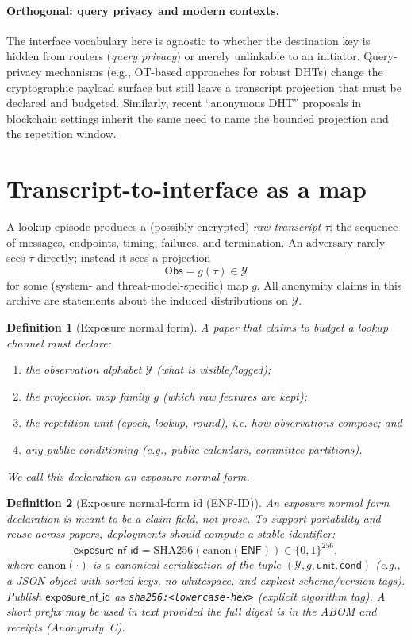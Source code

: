 \documentclass[11pt]{article}
\newtheorem{definition}{Definition}
\begin{document}
\paragraph{Orthogonal: query privacy and modern contexts.}
The interface vocabulary here is agnostic to whether the destination key is hidden from routers (\emph{query privacy})
or merely unlinkable to an initiator.
Query-privacy mechanisms (e.g., OT-based approaches for robust DHTs) change the cryptographic payload surface but still leave a transcript projection that must be declared and budgeted. \cite{BackesQueryPrivacy2012}
Similarly, recent ``anonymous DHT'' proposals in blockchain settings inherit the same need to name the bounded projection and the repetition window. \cite{TsengNCDHT2024}


\section{Transcript-to-interface as a map}
A lookup episode produces a (possibly encrypted) \emph{raw transcript} $\tau$: the sequence of messages, endpoints, timing, failures, and termination.
An adversary rarely sees $\tau$ directly; instead it sees a projection
\[
\mathsf{Obs} = g(\tau) \in \mathcal{Y}
\]
for some (system- and threat-model-specific) map $g$.
All anonymity claims in this archive are statements about the induced distributions on $\mathcal{Y}$.

\begin{definition}[Exposure normal form]
A paper that claims to budget a lookup channel must declare:
\begin{enumerate}[leftmargin=*]
\item the observation alphabet $\mathcal{Y}$ (what is visible/logged);
\item the projection map family $g$ (which raw features are kept);
\item the repetition unit (epoch, lookup, round), i.e. how observations compose; and
\item any public conditioning (e.g., public calendars, committee partitions).
\end{enumerate}
We call this declaration an \emph{exposure normal form}.
\end{definition}

\begin{definition}[Exposure normal-form id (ENF-ID)]
An exposure normal form declaration is meant to be a \emph{claim field}, not prose.
To support portability and reuse across papers, deployments should compute a stable identifier:
\[
\mathsf{exposure\_nf\_id}=\mathrm{SHA256}(\mathrm{canon}(\mathsf{ENF}))\in\{0,1\}^{256},
\]
where $\mathrm{canon}(\cdot)$ is a canonical serialization of the tuple
$(\mathcal Y,g,\mathsf{unit},\mathsf{cond})$ (e.g., a JSON object with sorted keys, no whitespace, and explicit schema/version tags).
Publish $\mathsf{exposure\_nf\_id}$ as \texttt{sha256:<lowercase-hex>} (explicit algorithm tag). A short prefix may be used in text provided the full digest is in the ABOM and receipts (Anonymity~C).
\end{definition}
\end{document}
